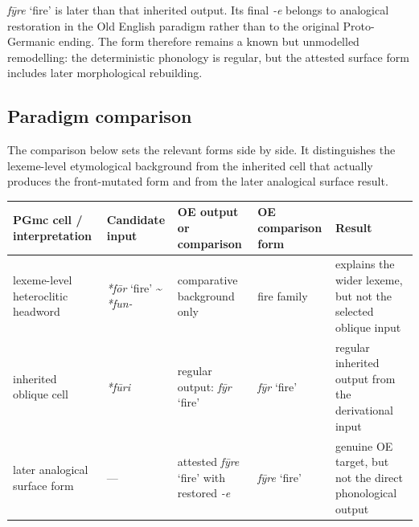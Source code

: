 \documentclass[
  british,
  a4paper,
  openany]{book}
\newcounter{none} %
\providecommand{\Recon}[1]{\emph{*#1}}
{\catcode`→=\active \global\def→{\ensuremath{\rightarrow}}}
\providecommand{\Recon}[1]{\emph{*#1}}
{\catcode`→=\active \global\def→{\ensuremath{\rightarrow}}}
\begin{document}
{\emph{fȳre}} `fire' is later than that inherited output. Its final
\emph{-e} belongs to analogical restoration in the Old English paradigm
rather than to the original Proto-Germanic ending. The form therefore
remains a known but unmodelled remodelling: the deterministic phonology
is regular, but the attested surface form includes later morphological
rebuilding.

\subsection{Paradigm comparison}\label{paradigm-comparison-28}

The comparison below sets the relevant forms side by side. It
distinguishes the lexeme-level etymological background from the
inherited cell that actually produces the front-mutated form and from
the later analogical surface result.

{\def\LTcaptype{none} %
\begin{longtable}[]{@{}
  >{\raggedright\arraybackslash}p{}
  >{\raggedright\arraybackslash}p{}
  >{\raggedright\arraybackslash}p{}
  >{\raggedright\arraybackslash}p{}
  >{\raggedright\arraybackslash}p{}@{}}
\toprule\noalign{}
\begin{minipage}[b]{\linewidth}\raggedright
PGmc cell / interpretation
\end{minipage} & \begin{minipage}[b]{\linewidth}\raggedright
Candidate input
\end{minipage} & \begin{minipage}[b]{\linewidth}\raggedright
OE output or comparison
\end{minipage} & \begin{minipage}[b]{\linewidth}\raggedright
OE comparison form
\end{minipage} & \begin{minipage}[b]{\linewidth}\raggedright
Result
\end{minipage} \\
\midrule\noalign{}
\endhead
\bottomrule\noalign{}
\endlastfoot
lexeme-level heteroclitic headword & \Recon{fōr} `fire'
\textasciitilde{} \emph{*fun-} & comparative background only & fire
family & explains the wider lexeme, but not the selected oblique
input \\
inherited oblique cell & {\emph{*fūri}} & regular output: {\emph{fȳr}}
`fire' & {\emph{fȳr}} `fire' & regular inherited output from the
derivational input \\
later analogical surface form & --- & attested {\emph{fȳre}} `fire' with
restored \emph{-e} & {\emph{fȳre}} `fire' & genuine OE target, but not
the direct phonological output \\
\end{longtable}
}
\end{document}
